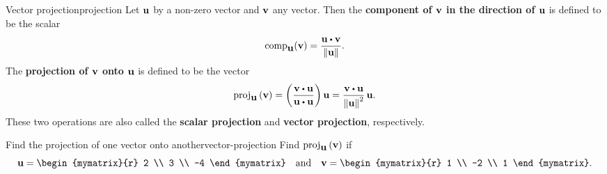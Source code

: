 \begin{definition}{Vector projection}{projection}
  Let $\mbox{\bf u}$ by a non-zero vector and $\mbox{\bf v}$ any vector. Then
  the \textbf{component of $\mbox{\bf v}$ in the direction of
    $\mbox{\bf u}$} is defined to be the scalar
  \begin{equation*}
    \func{comp}_{\vect{u}}(\vect{v})
    = \frac{\vect{u}\dotprod \vect{v}}{\norm{\vect{u}}}.
  \end{equation*}
  The \textbf{projection of $\mbox{\bf v}$ onto
    $\mbox{\bf u}$} is defined to be the vector
  \begin{equation*}
    \func{proj}_{\vect{u}}\tup{\vect{v}} =\tup{
      \frac{\vect{v}\dotprod \vect{u}}{\vect{u}\dotprod \vect{u}}} \vect{u}
    =
    \frac{\vect{v}\dotprod \vect{u}}{\norm{\vect{u}} ^{2}}\,\vect{u}.
  \end{equation*}
  These two operations are also called the \textbf{scalar
    projection}
  and \textbf{vector projection}, respectively.
\end{definition}

\begin{example}{Find the projection of one vector onto another}{vector-projection}
  Find $\mbox{\rm proj}_{\mbox{\bf u}}\left(\mbox{\bf v}\right)$ if
  \begin{equation*}
    \vect{u}=
    \begin{mymatrix}{r}
      2 \\
      3 \\
      -4
    \end{mymatrix}
    \quad\mbox{and}\quad
    \vect{v}=
    \begin{mymatrix}{r}
      1 \\
      -2 \\
      1
    \end{mymatrix}.
  \end{equation*}
\end{example}

